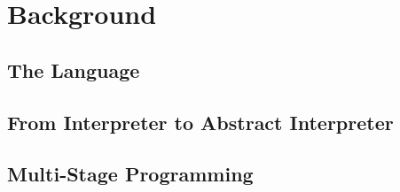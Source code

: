 \section{Background}

\subsection{The Language}

\subsection{From Interpreter to Abstract Interpreter}

\subsection{Multi-Stage Programming}
